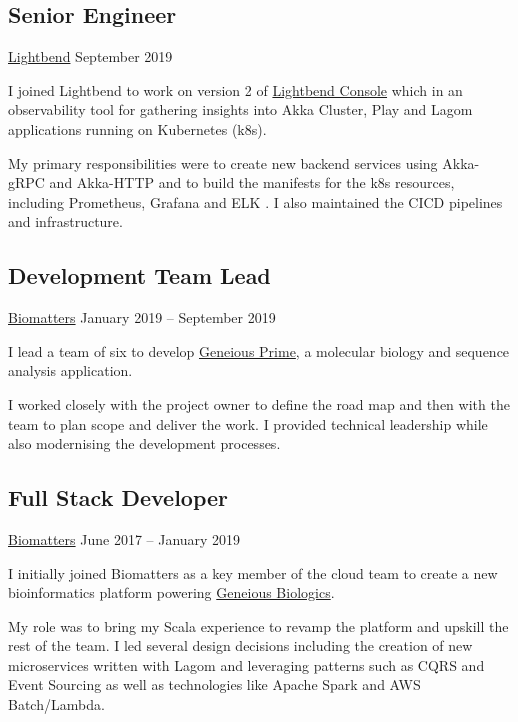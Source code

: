 \documentclass[11pt]{article}
\begin{document}
    \subsection{Senior Engineer}
    \label{subsec:senior-engineer}
    \href{https://www.lightbend.com/}{Lightbend}
    September 2019

    I joined Lightbend to work on version 2 of
    \href{https://developer.lightbend.com/docs/console/current/}{Lightbend Console}
    which in an observability tool for gathering insights into Akka Cluster, Play and Lagom
    applications running on Kubernetes (k8s).

    My primary responsibilities were to create new backend services using Akka-gRPC and Akka-HTTP
    and to build the manifests for the k8s resources, including Prometheus, Grafana and ELK .
    I also maintained the CICD pipelines and infrastructure.

    \subsection{Development Team Lead}
    \label{subsec:development-team-lead}
    \href{https://www.geneious.com/about/}{Biomatters}
    January 2019 -- September 2019

    I lead a team of six to develop \href{https://www.geneious.com/prime/}{Geneious Prime},
    a molecular biology and sequence analysis application.

    I worked closely with the project owner to define the road map and then with the team to plan
    scope and deliver the work.
    I provided technical leadership while also modernising the development processes.

    \subsection{Full Stack Developer}
    \label{subsec:full-stack-developer}
    \href{https://www.geneious.com/about/}{Biomatters}
    June 2017 -- January 2019

    I initially joined Biomatters as a key member of the cloud team to create a new bioinformatics
    platform powering \href{https://www.geneious.com/biopharma/}{Geneious Biologics}.

    My role was to bring my Scala experience to revamp the platform and upskill the rest of the
    team.
    I led several design decisions including the creation of new microservices written with Lagom
    and leveraging patterns such as CQRS and Event Sourcing as well as technologies like Apache
    Spark and AWS Batch/Lambda.
\end{document}
